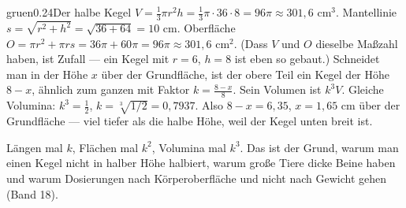 \begin{loesungkarte}{gruen}{0.24}{Der halbe Kegel}
$V = \frac13\pi r^{2}h = \frac13\pi\cdot36\cdot8 = 96\pi\approx301{,}6$ cm$^{3}$. Mantellinie $s = \sqrt{r^{2} + h^{2}} = \sqrt{36 + 64} = 10$ cm. Oberfläche $O = \pi r^{2} + \pi rs = 36\pi + 60\pi = 96\pi\approx301{,}6$ cm$^{2}$. (Dass $V$ und $O$ dieselbe Maßzahl haben, ist Zufall --- ein Kegel mit $r = 6$, $h = 8$ ist eben so gebaut.)
Schneidet man in der Höhe $x$ über der Grundfläche, ist der obere Teil ein Kegel der Höhe $8 - x$, ähnlich zum ganzen mit Faktor $k = \frac{8 - x}8$. Sein Volumen ist $k^{3}V$. Gleiche Volumina: $k^{3} = \frac12$, $k = \sqrt[3]{1/2} = 0{,}7937$. Also $8 - x = 6{,}35$, $x = 1{,}65$ cm über der Grundfläche --- viel tiefer als die halbe Höhe, weil der Kegel unten breit ist.
\begin{center}
\end{center}
\begin{mitnehmen}\kastentext
Längen mal $k$, Flächen mal $k^{2}$, Volumina mal $k^{3}$. Das ist der Grund, warum man einen Kegel nicht in halber Höhe halbiert, warum große Tiere dicke Beine haben und warum Dosierungen nach Körperoberfläche und nicht nach Gewicht gehen (Band 18).
\end{mitnehmen}
\end{loesungkarte}

